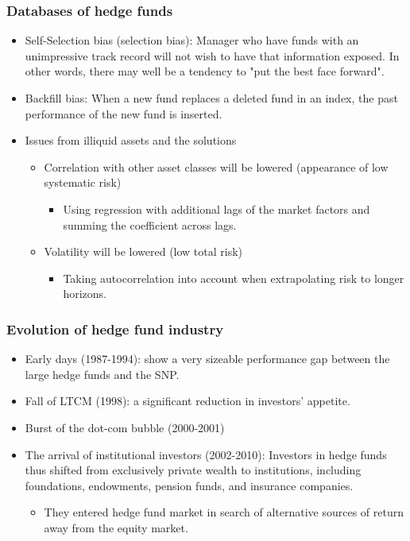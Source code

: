 \subsubsection{Databases of hedge funds}
\begin{itemize}
\item Self-Selection bias (selection bias): Manager who have funds with an unimpressive track record will not wish to have that information exposed. In other words, there may well be a tendency to "put the best face forward".
\item Backfill bias: When a new fund replaces a deleted fund in an index, the past performance of the new fund is inserted.
\item Issues from illiquid assets and the solutions
    \begin{itemize}
    \item Correlation with other asset classes will be lowered (appearance of low systematic risk)
        \begin{itemize}
        \item Using regression with additional lags of the market factors and summing the coefficient across lags.
        \end{itemize}
    \item Volatility will be lowered (low total risk)
        \begin{itemize}
        \item Taking autocorrelation into account when extrapolating risk to longer horizons.
        \end{itemize}
    \end{itemize}
\end{itemize}



\subsubsection{Evolution of hedge fund industry}
\begin{itemize}
\item Early days (1987-1994): show a very sizeable performance gap between the large hedge funds and the SNP.
\item Fall of LTCM (1998): a significant reduction in investors' appetite.
\item Burst of the dot-com bubble (2000-2001)
\item The arrival of institutional investors (2002-2010): Investors in hedge funds thus shifted from exclusively private wealth to institutions, including foundations, endowments, pension funds, and insurance companies.
    \begin{itemize}
    \item They entered hedge fund market in search of alternative sources of return away from the equity market.
    \end{itemize}
\end{itemize}



